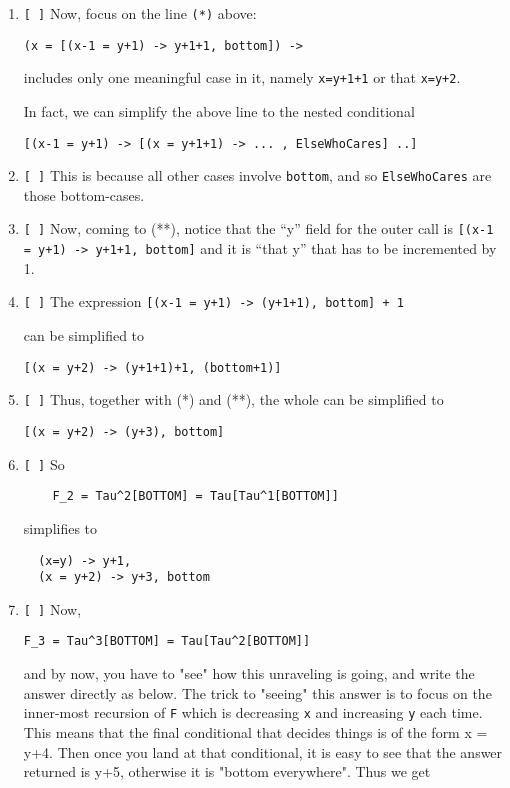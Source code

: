 \documentclass[11pt]{article}
\begin{document}
\begin{Large}
\begin{enumerate}
\begin{footnotesize}
\begin{verbatim}
  (x = [(x-1 = y+1) -> y+1+1, bottom]) ->          ; Detail (*) below

       [(x-1 = y+1) -> y+1+1, bottom] + 1 , bottom ; Detail (**) below

\end{verbatim}
\end{footnotesize}
\item \verb|[ ]|
  Now, focus on the line {\tt (*)} above:
  
  {\tt   (x = [(x-1 = y+1) -> y+1+1, bottom]) -> }

  includes only one meaningful case in it, namely {\tt x=y+1+1}
  or that {\tt x=y+2}.

  In fact, we  can simplify the above line to the nested
  conditional

  {\tt   [(x-1 = y+1) -> [(x = y+1+1) -> ... , ElseWhoCares] ..] }

\item \verb|[ ]| This is because all other cases involve
  {\tt bottom}, and so {\tt ElseWhoCares} are those bottom-cases.

\item \verb|[ ]| Now, coming to (**),
  notice that the ``y'' field for the
  outer call is
  {\tt [(x-1 = y+1) -> y+1+1, bottom]}
  and it is ``that y'' that has to be incremented by 1.

\item \verb|[ ]| The expression
  {\tt [(x-1 = y+1) -> (y+1+1), bottom] + 1 }
  
  can be simplified to

  {\tt [(x = y+2) -> (y+1+1)+1, (bottom+1)]}

 
\item \verb|[ ]| Thus, together with (*) and (**),
  the whole can be simplified to
  
    {\tt [(x = y+2) -> (y+3), bottom]}
  
  \item \verb|[ ]| So
\begin{verbatim}
    F_2 = Tau^2[BOTTOM] = Tau[Tau^1[BOTTOM]] 
\end{verbatim}
simplifies to
\begin{verbatim}  
  (x=y) -> y+1,
  (x = y+2) -> y+3, bottom
\end{verbatim}

\item \verb|[ ]|
  Now,
\begin{verbatim}    
F_3 = Tau^3[BOTTOM] = Tau[Tau^2[BOTTOM]]
\end{verbatim}
and
by now, you have to "see" how this unraveling is going, and write
the answer directly as below. The trick to "seeing" this answer is
to focus on the inner-most recursion of {\tt F} which is decreasing
{\tt x} and increasing {\tt y} each time. This means that the final
conditional that decides things is of the form x = y+4.
Then once you
land at that conditional, it is easy to see that the answer returned
is y+5, otherwise it is "bottom everywhere". Thus we get


\end{enumerate}
\end{Large}
\end{document}
